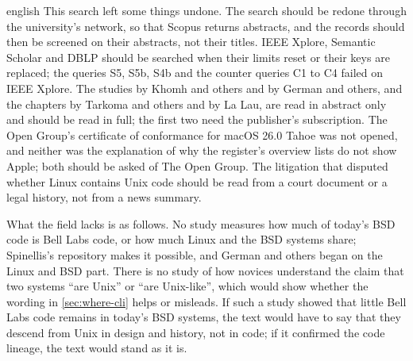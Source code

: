 \begin{onlyin}{english} %
This search left some things undone.
The search should be redone through the university's network, so that
Scopus returns abstracts, and the records should then be screened on
their abstracts, not their titles.
IEEE Xplore, Semantic Scholar and DBLP should be searched when their
limits reset or their keys are replaced; the queries S5, S5b, S4b and the
counter queries C1 to C4 failed on IEEE Xplore.
The studies by Khomh and others and by German and others, and the
chapters by Tarkoma and others and by La Lau, are read in abstract only
and should be read in full; the first two need the publisher's
subscription.
The Open Group's certificate of conformance for macOS 26.0 Tahoe was
not opened, and neither was the explanation of why the register's
overview lists do not show Apple; both should be asked of The Open Group.
The litigation that disputed whether Linux contains Unix code should be
read from a court document or a legal history, not from a news summary.

What the field lacks is as follows.
No study measures how much of today's BSD code is Bell Labs code, or
how much Linux and the BSD systems share; Spinellis's repository makes it
possible, and German and others began on the Linux and BSD part.
There is no study of how novices understand the claim that two systems
\enquote{are Unix} or \enquote{are Unix-like}, which would show whether
the wording in \cref{sec:where-cli} helps or misleads.
If such a study showed that little Bell Labs code remains in today's
BSD systems, the text would have to say that they descend from Unix in
design and history, not in code; if it confirmed the code lineage, the
text would stand as it is.
\end{onlyin}
